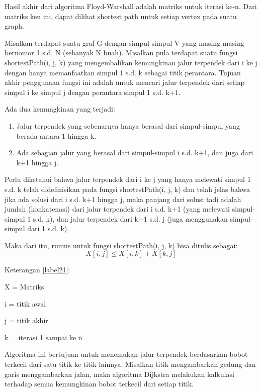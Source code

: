 Hasil akhir dari algoritma Floyd-Warshall adalah matriks untuk iterasi ke-n. Dari matriks ken ini, dapat dilihat shortest path untuk setiap vertex pada suatu graph.

Misalkan terdapat suatu graf G dengan simpul-simpul V yang  masing-masing  bernomor  1  s.d.  N  (sebanyak  N  buah).      Misalkan      pula      terdapat      suatu      fungsi      shortestPath(i,   j,   k)    yang    mengembalikan    kemungkinan  jalur  terpendek  dari  i  ke  j  dengan  hanya  memanfaatkan simpul 1 s.d. k sebagai titik perantara. Tujuan   akhir   penggunaan   fungsi   ini   adalah   untuk   mencari  jalur  terpendek  dari  setiap  simpul  i  ke  simpul  j  dengan perantara simpul 1 s.d. k+1. 

Ada dua kemungkinan yang terjadi:  
\begin{enumerate}
    \item Jalur terpendek yang sebenarnya hanya berasal dari simpul-simpul yang berada antara 1 hingga k. 
    \item Ada sebagian jalur yang berasal dari simpul-simpul i s.d. k+1, dan juga dari k+1 hingga j.
\end{enumerate}{}

Perlu  diketahui  bahwa  jalur  terpendek  dari  i  ke  j  yang  hanya  melewati  simpul  1  s.d.  k  telah  didefinisikan  pada  fungsi  shortestPath(i,  j,  k)  dan  telah  jelas  bahwa  jika  ada  solusi  dari  i  s.d.  k+1  hingga  j,  maka  panjang  dari  solusi  tadi adalah jumlah (konkatenasi) dari jalur terpendek dari i s.d. k+1 (yang melewati simpul-simpul 1 s.d. k), dan jalur terpendek  dari  k+1  s.d.  j  (juga  menggunakan  simpul-simpul dari 1 s.d. k).

Maka  dari  itu,  rumus  untuk  fungsi  shortestPath(i, j, k) bisa ditulis sebagai:
\begin{equation}
    \label{label21}
    X[i,j] ≤ X[i,k] + X[k,j]
\end{equation}
    \par Keterangan \ref{label21}:
        \par X = Matriks
        \par i = titik awal
        \par j = titik akhir
        \par k = iterasi 1 sampai ke n

Algoritma ini bertujuan untuk menemukan jalur
terpendek berdasarkan bobot terkecil dari satu titik ke titik
lainnya. Misalkan titik mengambarkan gedung dan garis
menggambarkan jalan, maka algoritma Dijkstra melakukan
kalkulasi terhadap semua kemungkinan bobot terkecil dari
setiap titik.

